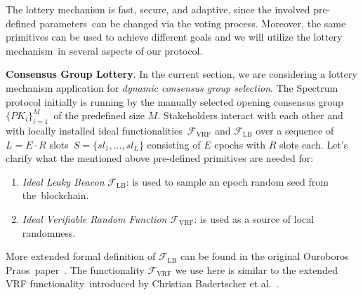 The lottery mechanism is fast, secure, and adaptive, since the involved pre-defined parameters\
can be changed via the voting process.
Moreover, the same primitives can be used to achieve different goals and we will utilize the lottery mechanism\
in several aspects of our protocol.

\textbf{Consensus Group Lottery}.
In the current section, we are considering a lottery mechanism application for \emph{dynamic consensus group selection}.
The Spectrum protocol initially is running by the manually selected opening consensus group $\{PK_i\}_{i=1}^M$\
of the predefined size $M$.
Stakeholders interact with each other and with locally installed ideal functionalities\
$\mathcal{F}_{\text{VRF}}$ and $\mathcal{F}_{\text{LB}}$ over a sequence of $L = E \cdot R$ slots\
${S=\{sl_1,\dots,sl_L\}}$ consisting of $E$ epochs with $R$ slots each.
Let's clarify what the mentioned above pre-defined primitives are needed for:
\begin{enumerate}
    \item \emph{Ideal Leaky Beacon} $\mathcal{F}_{\text{LB}}$: is used to sample an epoch random seed from the\
    blockchain.
    \item \emph{Ideal Verifiable Random Function} $\mathcal{F}_{\text{VRF}}$: is used as a source of local randomness.
\end{enumerate}
More extended formal definition of ${\mathcal{F}}_{\text{LB}}$ can be found in the original Ouroboros Praos\
paper~\cite{cryptoeprint:2017/573}.
The functionality ${\mathcal{F}}_{\text{VRF}}$ we use here is similar to the extended VRF functionality\
introduced by Christian Badertscher et al.~\cite{cryptoeprint:2022/1045}.


